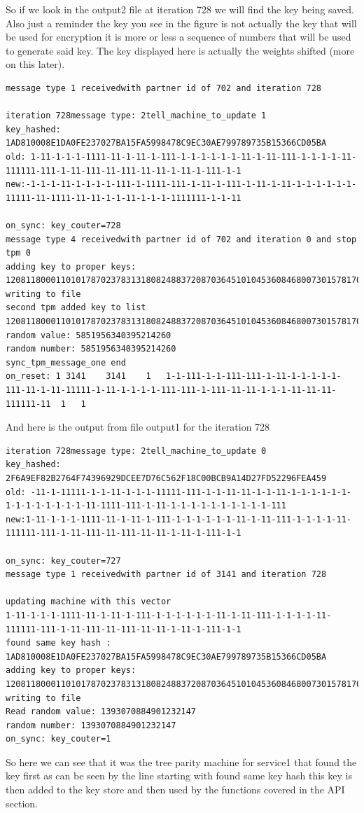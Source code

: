 So if we look in the output2 file at iteration 728 we will find the key being saved. Also just a reminder the key you see in the figure is not actually the key that will be used for encryption it is more or less a sequence of numbers that will be used to generate said key. The key displayed here is actually the weights shifted (more on this later). 
\begin{lstlisting}
message type 1 receivedwith partner id of 702 and iteration 728

iteration 728message type: 2tell_machine_to_update 1
key_hashed: 1AD810008E1DA0FE237027BA15FA5998478C9EC30AE799789735B15366CD05BA
old: 1-11-1-1-1-1111-11-1-11-1-111-1-1-1-1-1-1-11-1-11-111-1-1-1-1-11-111111-111-1-11-111-11-111-11-11-1-11-1-111-1-1
new:-1-1-1-11-1-1-1-1-111-1-1111-111-1-11-1-111-1-11-1-11-1-1-1-1-1-1-11111-11-1111-11-11-1-1-11-1-1-1-1111111-1-1-11

on_sync: key_couter=728
message type 4 receivedwith partner id of 702 and iteration 0 and stop tpm 0
adding key to proper keys: 120811800011010178702378313180824883720870364510104536084680073015781700
writing to file
second tpm added key to list 120811800011010178702378313180824883720870364510104536084680073015781700Read random value: 5851956340395214260
random number: 5851956340395214260
sync_tpm_message_one end
on_reset: 1	3141	3141	1	1-1-111-1-1-111-111-1-11-1-1-1-1-1-111-11-1-11-11111-1-11-1-1-1-1-111-111-1-111-11-11-1-1-1-11-11-11-111111-11	1	1
\end{lstlisting}
And here is the output from file output1 for the iteration 728

\begin{lstlisting}
iteration 728message type: 2tell_machine_to_update 0
key_hashed: 2F6A9EF82B2764F74396929DCEE7D76C562F18C00BCB9A14D27FD52296FEA459
old: -11-1-11111-1-1-11-1-1-1-11111-111-1-1-11-11-1-1-11-1-1-1-1-1-1-1-1-1-1-1-1-1-1-11-1111-111-1-11-1-1-1-1-1-1-1-1-1-1-111
new:1-11-1-1-1-1111-11-1-11-1-111-1-1-1-1-1-1-11-1-11-111-1-1-1-1-11-111111-111-1-11-111-11-111-11-11-1-11-1-111-1-1

on_sync: key_couter=727
message type 1 receivedwith partner id of 3141 and iteration 728

updating machine with this vector 
1-11-1-1-1-1111-11-1-11-1-111-1-1-1-1-1-1-11-1-11-111-1-1-1-1-11-111111-111-1-11-111-11-111-11-11-1-11-1-111-1-1
found same key hash : 1AD810008E1DA0FE237027BA15FA5998478C9EC30AE799789735B15366CD05BA
adding key to proper keys: 120811800011010178702378313180824883720870364510104536084680073015781700
writing to file
Read random value: 1393070884901232147
random number: 1393070884901232147
on_sync: key_couter=1
\end{lstlisting}
So here we can see that it was the tree parity machine for service1 that found the key first as can be seen by the line starting with found same key hash this key is then added to the key store and then used by the functions covered in the API section. 

